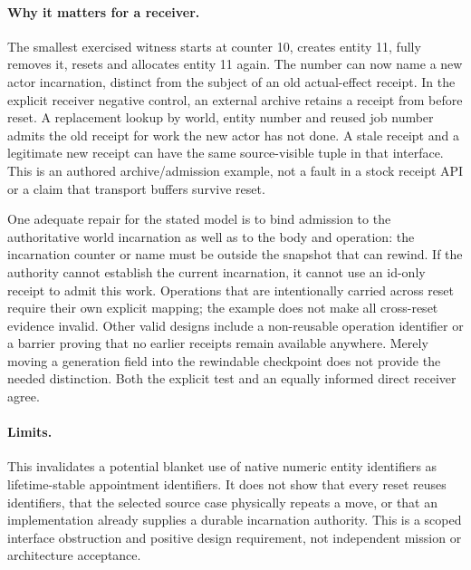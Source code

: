\documentclass{article}
\begin{document}
\paragraph{Why it matters for a receiver.}
The smallest exercised witness starts at counter 10, creates entity 11,
fully removes it, resets and allocates entity 11 again. The number can
now name a new actor incarnation, distinct from the subject of an old
actual-effect receipt. In the explicit receiver negative control, an
external archive retains a receipt from before reset. A replacement
lookup by world, entity number and reused job number admits the old
receipt for work the new actor has not done. A stale receipt and a
legitimate new receipt can have the same source-visible tuple in that
interface. This is an authored archive/admission example, not a fault
in a stock receipt API or a claim that transport buffers survive reset.

One adequate repair for the stated model is to bind admission to the
authoritative world incarnation as well as to the body and operation:
the incarnation counter or name must be outside the snapshot that can
rewind. If the authority cannot establish the current incarnation,
it cannot use an id-only receipt to admit this work. Operations that are
intentionally carried across reset require their own explicit mapping;
the example does not make all cross-reset evidence invalid. Other valid
designs include a non-reusable operation identifier or a barrier proving
that no earlier receipts remain available anywhere. Merely moving a
generation field into the rewindable checkpoint does not provide the
needed distinction. Both the explicit test and an equally informed direct
receiver agree.

\paragraph{Limits.}
This invalidates a potential blanket use of native numeric entity
identifiers as lifetime-stable appointment identifiers. It does not show
that every reset reuses identifiers, that the selected source case
physically repeats a move, or that an implementation already supplies a
durable incarnation authority. This is a scoped interface obstruction
and positive design requirement, not independent mission or architecture
acceptance.
\end{document}
